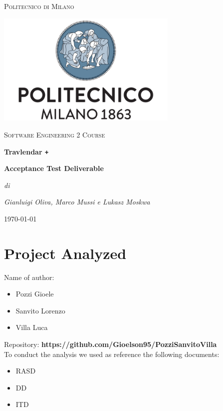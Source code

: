 \documentclass[numbers=noenddot, 12pt, a4paper, oneside]{scrbook}
\def\Plus{\texttt{+}}
\begin{document}
 
\begin{titlepage}
	\centering
	{\scshape\LARGE Politecnico di Milano \par}
	\vspace{1cm}
	\includegraphics[width=0.65\textwidth]{polimi-logo}\par
	\vspace{1cm}
		
	{\scshape\Large Software Engineering 2 Course\par}
	\vspace{1.5cm}
	{\huge\bfseries Travlendar \Plus \par}
	\vspace{1cm}
	{\Large\bfseries Acceptance Test Deliverable \par}
	\vspace{3cm}
	{\Large\itshape di\par}
	{\Large\itshape Gianluigi Oliva, Marco Mussi e Lukasz Moskwa\par}
	\vspace{1.5cm}
	\vfill

	
	\vfill
	
	{\large \today\par}
\end{titlepage}

\newpage 
\tableofcontents
\newpage 

\chapter{Project Analyzed}
Name of author:
\begin{itemize}
	\item Pozzi Gioele
	\item Sanvito Lorenzo
	\item Villa Luca
\end{itemize}

Repository: \textbf{https://github.com/Gioelson95/PozziSanvitoVilla}\\\newline
To conduct the analysis we used as reference the following documents:
\begin{itemize}
	\item RASD
	\item DD
	\item ITD
\end{itemize}
\end{document}

